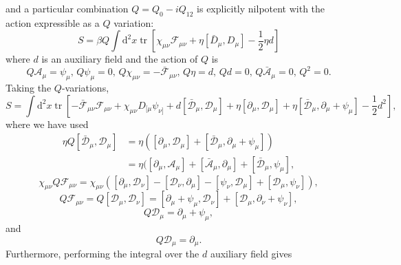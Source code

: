 and a particular combination $Q = Q_0 - i Q_{12}$ is explicitly nilpotent with the action expressible as a $Q$ variation:
\begin{equation}
\label{eq:q_action}
    S = \beta Q \int \text{d}^2 x \operatorname{tr}\left[\chi_{\mu \nu}\mathcal{F}_{\mu \nu} + \eta [\bar{D}_\mu, D_\mu] - \frac{1}{2}\eta d\right]
\end{equation}
where $d$ is an auxiliary field and the action of $Q$ is
\begin{equation}
    Q \mathcal{A}_\mu = \psi_\mu, \, Q \psi_\mu = 0, \, Q \chi_{\mu \nu} = - \bar{\mathcal{F}}_{\mu \nu}, \, Q \eta = d, \, Q d = 0, \, Q \bar{\mathcal{A}}_\mu = 0, \, Q^2 = 0.
\end{equation}
Taking the $Q$-variations,
\begin{equation}
    S = \int \text{d}^2 x \operatorname{tr}\left[-\bar{\mathcal{F}}_{\mu \nu}\mathcal{F}_{\mu \nu} + \chi_{\mu \nu} D_{[\mu}\psi_{\nu ]} + d [\bar{\mathcal{D}}_\mu, \mathcal{D}_\mu] + \eta [\partial_\mu, \mathcal{D}_\mu] + \eta[\bar{\mathcal{D}}_\mu, \partial_\mu + \psi_\mu] - \frac{1}{2}d^2 \right],
\end{equation}
where we have used
\begin{align}
    \eta Q [\bar{\mathcal{D}}_\mu, \mathcal{D}_\mu] &= \eta([\partial_\mu, \mathcal{D}_\mu] + [\bar{\mathcal{D}}_\mu, \partial_\mu+\psi_\mu]) \nonumber \\
    &= \eta([\partial_\mu, \mathcal{A}_\mu] + [\bar{\mathcal{A}}_\mu, \partial_\mu] + [\bar{\mathcal{D}}_\mu, \psi_\mu],
\end{align}
\begin{equation}
    \chi_{\mu \nu}Q \mathcal{F}_{\mu \nu} = \chi_{\mu \nu}([\partial_\mu, \mathcal{D}_\nu] - [\mathcal{D}_\nu, \partial_\mu] - [\psi_\nu, \mathcal{D}_\mu] + [\mathcal{D}_\mu, \psi_\nu]),
\end{equation}
\begin{equation}
    Q \mathcal{F}_{\mu \nu} = Q [\mathcal{D}_\mu, \mathcal{D}_\nu] = [\partial_\mu + \psi_\mu, \mathcal{D}_\nu] + [\mathcal{D}_\mu, \partial_\nu + \psi_\nu],
\end{equation}
\begin{equation}
    Q \mathcal{D}_\mu = \partial_\mu + \psi_\mu,
\end{equation}
and
\begin{equation}
    Q \mathcal{D}_\mu = \partial_\mu.
\end{equation}
%
Furthermore, performing the integral over the $d$ auxiliary field gives
